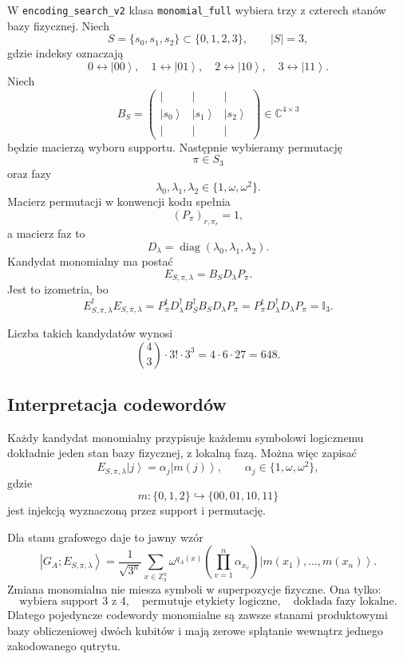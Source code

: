 \documentclass[11pt,a4paper]{article}
\newcommand{\C}{\mathbb{C}}
\newcommand{\Z}{\mathbb{Z}}
\newcommand{\id}{\mathbb{I}}
\newcommand{\w}{\omega}
\newcommand{\diag}{\operatorname{diag}}
\newcommand{\ket}[1]{\left|#1\right\rangle}
\begin{document}
W \texttt{encoding\_search\_v2} klasa \texttt{monomial\_full} wybiera trzy z
czterech stanów bazy fizycznej. Niech
\[
    S=\{s_0,s_1,s_2\}\subset\{0,1,2,3\},
    \qquad |S|=3,
\]
gdzie indeksy oznaczają
\[
    0\leftrightarrow \ket{00},\quad
    1\leftrightarrow \ket{01},\quad
    2\leftrightarrow \ket{10},\quad
    3\leftrightarrow \ket{11}.
\]
Niech
\[
    B_S=
    \begin{pmatrix}
        \vert & \vert & \vert\\
        \ket{s_0} & \ket{s_1} & \ket{s_2}\\
        \vert & \vert & \vert
    \end{pmatrix}
    \in\C^{4\times 3}
\]
będzie macierzą wyboru supportu. Następnie wybieramy permutację
\[
    \pi\in S_3
\]
oraz fazy
\[
    \lambda_0,\lambda_1,\lambda_2\in\{1,\w,\w^2\}.
\]
Macierz permutacji w konwencji kodu spełnia
\[
    (P_\pi)_{r,\pi_r}=1,
\]
a macierz faz to
\[
    D_\lambda=\diag(\lambda_0,\lambda_1,\lambda_2).
\]
Kandydat monomialny ma postać
\[
    \boxed{
    E_{S,\pi,\lambda}
    =
    B_S D_\lambda P_\pi
    }.
\]
Jest to izometria, bo
\[
    E_{S,\pi,\lambda}^\dagger E_{S,\pi,\lambda}
    =
    P_\pi^\dagger D_\lambda^\dagger B_S^\dagger B_S D_\lambda P_\pi
    =
    P_\pi^\dagger D_\lambda^\dagger D_\lambda P_\pi
    =
    \id_3.
\]

Liczba takich kandydatów wynosi
\[
    \binom{4}{3}\cdot 3!\cdot 3^3
    =
    4\cdot 6\cdot 27
    =
    648.
\]

\subsection{Interpretacja codewordów}

Każdy kandydat monomialny przypisuje każdemu symbolowi logicznemu dokładnie
jeden stan bazy fizycznej, z lokalną fazą. Można więc zapisać
\[
    E_{S,\pi,\lambda}\ket{j}
    =
    \alpha_j\ket{m(j)},
    \qquad
    \alpha_j\in\{1,\w,\w^2\},
\]
gdzie
\[
    m:\{0,1,2\}\hookrightarrow \{00,01,10,11\}
\]
jest injekcją wyznaczoną przez support i permutację.

Dla stanu grafowego daje to jawny wzór
\[
    \boxed{
    \ket{G_A;E_{S,\pi,\lambda}}
    =
    \frac{1}{\sqrt{3^n}}
    \sum_{x\in\Z_3^n}
    \w^{q_A(x)}
    \left(\prod_{v=1}^n \alpha_{x_v}\right)
    \ket{m(x_1),\ldots,m(x_n)}
    }.
\]
Zmiana monomialna nie miesza symboli w superpozycje fizyczne. Ona tylko:
\[
    \text{wybiera support }3\text{ z }4,\quad
    \text{permutuje etykiety logiczne},\quad
    \text{dokłada fazy lokalne}.
\]
Dlatego pojedyncze codewordy monomialne są zawsze stanami produktowymi bazy
obliczeniowej dwóch kubitów i mają zerowe splątanie wewnątrz jednego
zakodowanego qutrytu.
\end{document}
